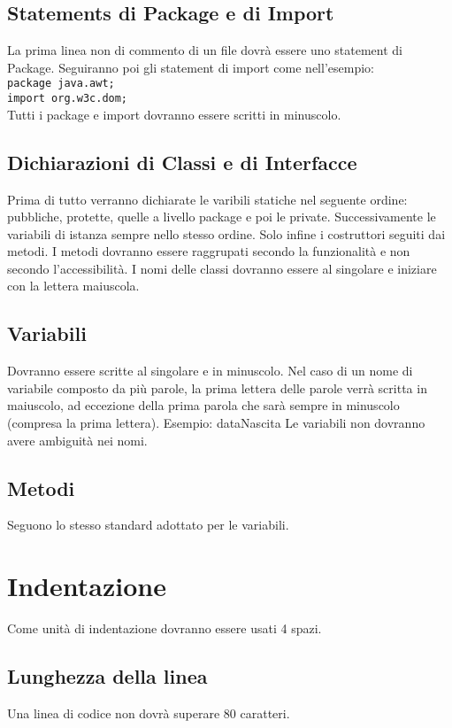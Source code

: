 \subsection{Statements di Package e di Import}
La prima linea non di commento di un file dovr\`a essere uno statement di Package. Seguiranno poi gli statement di import come nell'esempio: \\
 \newline
\texttt{package java.awt; \\ 
import org.w3c.dom; \\}
Tutti i package e import dovranno essere scritti in minuscolo.
\subsection{Dichiarazioni di Classi e di Interfacce}
Prima di tutto verranno dichiarate le varibili statiche nel seguente ordine: pubbliche, protette, quelle a livello package e poi le private. Successivamente le variabili di istanza sempre nello stesso ordine. Solo infine i costruttori seguiti dai metodi. I metodi dovranno essere raggrupati secondo la funzionalit\`a e non secondo l'accessibilit\`a. I nomi delle classi dovranno essere al singolare e iniziare con la lettera maiuscola.
\subsection{Variabili}
Dovranno essere scritte al singolare e in minuscolo. Nel caso di un nome di variabile composto da pi\`u parole, la prima lettera delle parole verr\`a scritta in maiuscolo, ad eccezione della prima parola che sar\`a sempre in minuscolo (compresa la prima lettera). \newline
Esempio: dataNascita \newline
Le variabili non dovranno avere ambiguit\`a nei nomi.
\subsection{Metodi}
Seguono lo stesso standard adottato per le variabili.

\section{Indentazione}
Come unit\`a di indentazione dovranno essere usati 4 spazi.
\subsection{Lunghezza della linea}
Una linea di codice non dovr\`a superare 80 caratteri.
